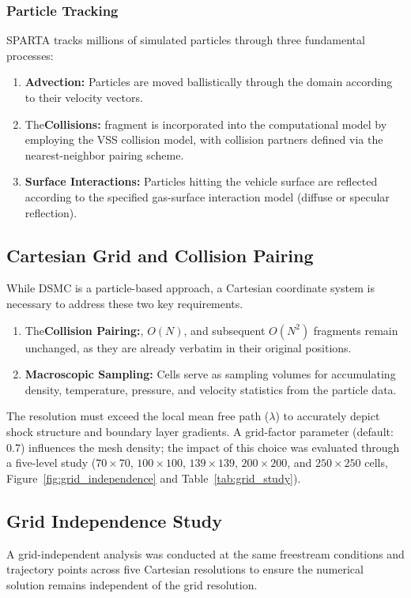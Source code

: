 \subsubsection*{Particle Tracking}
SPARTA tracks millions of simulated particles through three fundamental processes:
\begin{enumerate}
    \item \textbf{Advection:} Particles are moved ballistically through the domain according to their velocity vectors.

    \item The\textbf{Collisions:} fragment is incorporated into the computational model by employing the VSS collision model, with collision partners defined via the nearest-neighbor pairing scheme.

    \item \textbf{Surface Interactions:} Particles hitting the vehicle surface are reflected according to the specified gas-surface interaction model (diffuse or specular reflection).
\end{enumerate}

\subsection{Cartesian Grid and Collision Pairing}
While DSMC is a particle-based approach, a Cartesian coordinate system is necessary to address these two key requirements.
\begin{enumerate}
    \item The\textbf{Collision Pairing:}, $O(N)$, and subsequent $O(N^2)$ fragments remain unchanged, as they are already verbatim in their original positions.

    \item \textbf{Macroscopic Sampling:} Cells serve as sampling volumes for accumulating density, temperature, pressure, and velocity statistics from the particle data.
\end{enumerate}

The resolution must exceed the local mean free path ($\lambda$) to accurately depict shock structure and boundary layer gradients. A grid-factor parameter (default: 0.7) influences the mesh density; the impact of this choice was evaluated through a five-level study ($70\times70$, $100\times100$, $139\times139$, $200\times200$, and $250\times250$ cells, Figure~\ref{fig:grid_independence} and Table~\ref{tab:grid_study}).

\subsection{Grid Independence Study}
A grid-independent analysis was conducted at the same freestream conditions and trajectory points across five Cartesian resolutions to ensure the numerical solution remains independent of the grid resolution.

